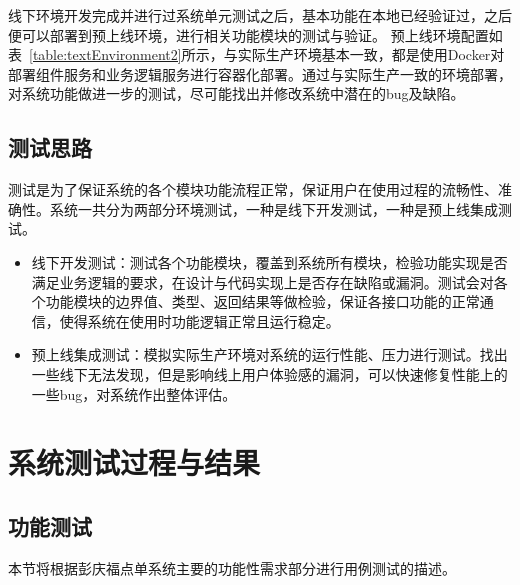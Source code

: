 线下环境开发完成并进行过系统单元测试之后，基本功能在本地已经验证过，之后便可以部署到预上线环境，进行相关功能模块的测试与验证。
预上线环境配置如表~\ref{table:textEnvironment2}所示，与实际生产环境基本一致，都是使用Docker对部署组件服务和业务逻辑服务进行容器化部署。通过与实际生产一致的环境部署，对系统功能做进一步的测试，尽可能找出并修改系统中潜在的bug及缺陷。\\

\subsection{测试思路}
测试是为了保证系统的各个模块功能流程正常，保证用户在使用过程的流畅性、准确性。系统一共分为两部分环境测试，一种是线下开发测试，一种是预上线集成测试。
\begin{itemize}
    \item 线下开发测试：测试各个功能模块，覆盖到系统所有模块，检验功能实现是否满足业务逻辑的要求，在设计与代码实现上是否存在缺陷或漏洞。测试会对各个功能模块的边界值、类型、返回结果等做检验，保证各接口功能的正常通信，使得系统在使用时功能逻辑正常且运行稳定。
    \item 预上线集成测试：模拟实际生产环境对系统的运行性能、压力进行测试。找出一些线下无法发现，但是影响线上用户体验感的漏洞，可以快速修复性能上的一些bug，对系统作出整体评估。
\end{itemize}

\section{系统测试过程与结果}
\subsection{功能测试}
本节将根据彭庆福点单系统主要的功能性需求部分进行用例测试的描述。

